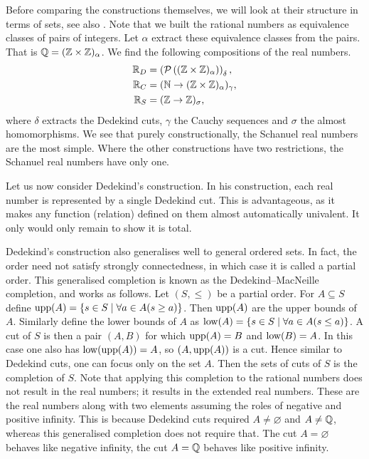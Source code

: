 \documentclass[../main.tex]{subfiles}
\begin{document}
Before comparing the constructions themselves, we will look at their structure in terms of sets, see also \cite{Borovik2012}. Note that we built the rational numbers as equivalence classes of pairs of integers. Let $\alpha$ extract these equivalence classes from the pairs. That is $\mathbb{Q}=(\mathbb{Z}\times\mathbb{Z})_\alpha$. We find the following compositions of the real numbers.
\begin{align*}
    \mathbb{R}_D & =\left(\mathcal{P}\left((\mathbb{Z}\times\mathbb{Z})_\alpha\right)\right)_\delta, \\
    \mathbb{R}_C & =(\mathbb{N}\to(\mathbb{Z}\times\mathbb{Z})_\alpha)_\gamma, \\
    \mathbb{R}_S & =(\mathbb{Z}\to\mathbb{Z})_\sigma,
\end{align*}
where $\delta$ extracts the Dedekind cuts, $\gamma$ the Cauchy sequences and $\sigma$ the almost homomorphisms. We see that purely constructionally, the Schanuel real numbers are the most simple. Where the other constructions have two restrictions, the Schanuel real numbers have only one.

Let us now consider Dedekind's construction. In his construction, each real number is represented by a single Dedekind cut. This is advantageous, as it makes any function (relation) defined on them almost automatically univalent. It only would only remain to show it is total. 

Dedekind's construction also generalises well to general ordered sets. In fact, the order need not satisfy strongly connectedness, in which case it is called a partial order. This generalised completion is known as the Dedekind–MacNeille completion, and works as follows. Let $(S,\leq)$ be a partial order. For $A\subseteq S$ define $\operatorname{upp}(A)=\{s\in S\mid\forall a\in A(s\geq a)\}$. Then $\operatorname{upp}(A)$ are the upper bounds of $A$. Similarly define the lower bounds of $A$ as $\operatorname{low}(A)=\{s\in S\mid\forall a\in A(s\leq a)\}$. A cut of $S$ is then a pair $(A,B)$ for which $\operatorname{upp}(A)=B$ and $\operatorname{low}(B)=A$. In this case one also has $\operatorname{low}(\operatorname{upp}(A))=A$, so $(A,\operatorname{upp}(A))$ is a cut. Hence similar to Dedekind cuts, one can focus only on the set $A$. Then the sets of cuts of $S$ is the completion of $S$. Note that applying this completion to the rational numbers does not result in the real numbers; it results in the extended real numbers. These are the real numbers along with two elements assuming the roles of negative and positive infinity. This is because Dedekind cuts required $A\neq\varnothing$ and $A\neq\mathbb{Q}$, whereas this generalised completion does not require that. The cut $A=\varnothing$ behaves like negative infinity, the cut $A=\mathbb{Q}$ behaves like positive infinity.
\end{document}
